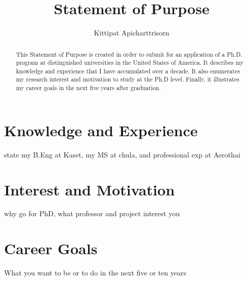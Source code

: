 \documentclass[12pt,a4paper,oneside,onecolumn]{article}
\title{Statement of Purpose}
\author{Kittipat Apicharttrisorn}
\begin{document}
\maketitle

\begin{abstract}
This Statement of Purpose is created in order to submit for an application of a Ph.D. program at distinguished universities in the United States of America. It describes my knowledge and experience that I have accumulated over a decade. It also enumerates my research interest and motivation to study at the Ph.D level. Finally, it illustrates my career goals in the next five years after graduation.
\end{abstract}

\section{Knowledge and Experience}
state my B.Eng at Kaset, my MS at chula, and professional exp at Aerothai
\section{Interest and Motivation}
why go for PhD, what professor and project interest you
\section{Career Goals}
What you want to be or to do in the next five or ten years
\end{document}
